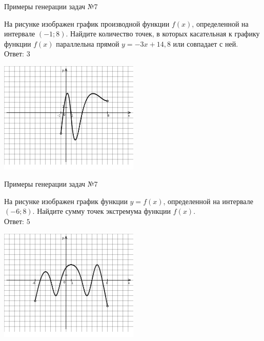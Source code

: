\documentclass[aspectratio=169]{beamer}
\begin{document}
\begin{frame}{Примеры генерации задач №7}
    
    \begin{multicols}{2}
        На рисунке изображен график производной функции $f(x)$, определенной на интервале $(-1; 8)$. Найдите количество точек, в которых касательная к графику функции $f(x)$ параллельна прямой $y=-3x+ 14{,}8 $ или совпадает с ней.\\

        Ответ: $3$

        \includegraphics[width=0.5\textwidth]{images/776525944899729n0}
      \end{multicols}
        
   
\end{frame}

\begin{frame}{Примеры генерации задач №7}
    \begin{multicols}{2}
        На рисунке изображен график функции $y=f(x)$, определенной на интервале $(-6;8)$. Найдите сумму точек экстремума функции $f(x)$.\\

        Ответ: $5$

        \includegraphics[width=0.5\textwidth]{images/020693809529216n0}
    \end{multicols}
\end{frame}
\end{document}
